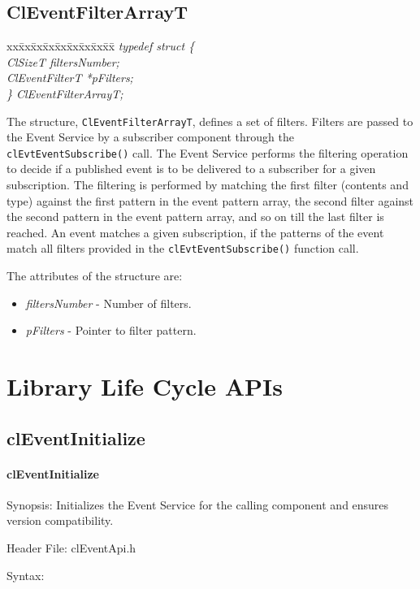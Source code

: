 \begin{flushleft}
\subsection{ClEventFilterArrayT}
\begin{tabbing}
xx\=xx\=xx\=xx\=xx\=xx\=xx\=xx\=xx\=\kill
\textit{typedef struct \{}\\
\>\>\>\>\textit{ClSizeT filtersNumber;}\\
\>\>\>\>\textit{ClEventFilterT *pFilters;}\\
\textit{\} ClEventFilterArrayT;}\end{tabbing}
The structure, {\tt{ClEventFilterArrayT}}, defines a set of filters. Filters are passed to the Event Service by a subscriber component through the 
{\tt{clEvtEventSubscribe()}} call. The Event Service performs the filtering operation to decide if a published event is to be delivered to a subscriber 
for a given subscription. The filtering is performed by matching the first filter (contents and type) against the first pattern in the event pattern 
array, the second filter against the second pattern in the event pattern array, and so on till the last filter is reached. An event matches a given
subscription, if the patterns of the event match all filters provided in the {\tt{clEvtEventSubscribe()}} function call. 
\par 
The attributes of the structure are:
\begin{itemize}
\item
\textit{filtersNumber} - Number of filters.
\item
\textit{pFilters} - Pointer to filter pattern.
\end{itemize} 



\newpage

\section{Library Life Cycle APIs}
\subsection{clEventInitialize}
\hypertarget{pageem101}{}\paragraph{cl\-Event\-Initialize}\label{pageem101}
\begin{Desc}
\item[Synopsis:]Initializes the Event Service for the calling component and ensures version compatibility.\end{Desc}
\begin{Desc}
\item[Header File:]clEventApi.h\end{Desc}
\begin{Desc}
\item[Syntax:]


\end{Desc}
\end{flushleft}
